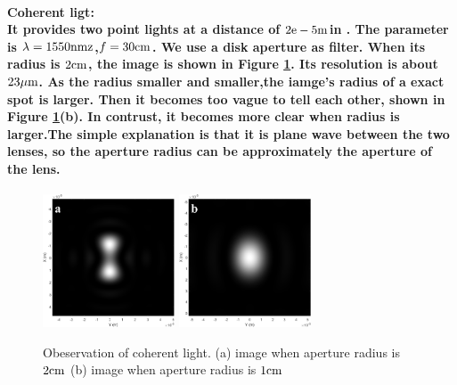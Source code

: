 \documentclass[fontsize=11pt]{scrartcl}
\begin{document}
\paragraph{\bf{Coherent ligt:} \\
It provides two point lights at a distance of $2\rm e -5 \rm m $in .
 The parameter is $\lambda=1550 \rm{nm}z$,$f=30\rm {cm}$. We use a disk aperture as filter. 
 When its radius is $2\rm {cm}$, the image is shown in Figure \ref{resolution}. Its resolution is about $23\rm {\mu m}$.
 As the radius smaller and smaller,the iamge's radius of a exact spot is larger. Then it becomes too vague to tell each other, 
 shown in Figure \ref{resolution}(b). In contrust, it becomes more clear
  when radius is larger.The simple explanation is that it is plane wave between the two lenses, 
  so the aperture radius can be approximately the aperture of the lens.}
 \begin{figure}[ht]
    \centering
    \includegraphics[width=0.35\textwidth]{task5-6_pic/2a.bmp}
    \includegraphics[width=0.35\textwidth]{task5-6_pic/2b.png}
    \caption{Obeservation of coherent light. (a) image when aperture radius is $2\rm {cm}$ 
    (b) image when aperture radius is $1\rm {cm}$}
    \label{resolution}
\end{figure}
\end{document}
